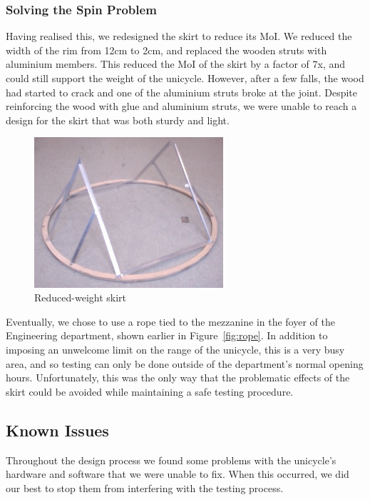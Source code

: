 \documentclass{IIBproject}
\begin{document}
\subsubsection{Solving the Spin Problem}

Having realised this, we redesigned the skirt to reduce its MoI. We reduced
the width of the rim from 12cm to 2cm, and replaced the wooden struts with
aluminium members. This reduced the MoI of the skirt by a factor of 7x, and
could still support the weight of the unicycle. However, after a few falls,
the wood had started to crack and one of the aluminium struts broke at the
joint. Despite reinforcing the wood with glue and aluminium struts, we were
unable to reach a design for the skirt that was both sturdy and light.

\begin{figure}[htpb]
  \begin{center}
    \includegraphics[width=7cm]{light_skirt.jpg}
    \end{center}
    \caption{Reduced-weight skirt}
    \label{fig:light_skirt}
    \end{figure}

Eventually, we chose to use a rope tied to the mezzanine in the foyer of the
Engineering department, shown earlier in Figure~\ref{fig:rope}. In addition to
imposing an unwelcome limit on the range of the unicycle, this is a very busy
area, and so testing can only be done outside of the department's normal
opening hours. Unfortunately, this was the only way that the problematic
effects of the skirt could be avoided while maintaining a safe testing
procedure.

\subsection{Known Issues}

Throughout the design process we found some problems with the unicycle's
hardware and software that we were unable to fix. When this occurred, we did
our best to stop them from interfering with the testing process.
\end{document}
